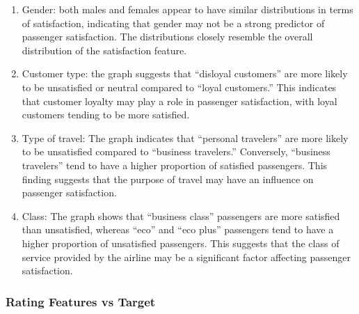 \documentclass[
]{article}
\begin{document}
\begin{enumerate}
\def\labelenumi{\arabic{enumi}.}
\item
  Gender: both males and females appear to have similar distributions in
  terms of satisfaction, indicating that gender may not be a strong
  predictor of passenger satisfaction. The distributions closely
  resemble the overall distribution of the satisfaction feature.
\item
  Customer type: the graph suggests that ``disloyal customers'' are more
  likely to be unsatisfied or neutral compared to ``loyal customers.''
  This indicates that customer loyalty may play a role in passenger
  satisfaction, with loyal customers tending to be more satisfied.
\item
  Type of travel: The graph indicates that ``personal travelers'' are
  more likely to be unsatisfied compared to ``business travelers.''
  Conversely, ``business travelers'' tend to have a higher proportion of
  satisfied passengers. This finding suggests that the purpose of travel
  may have an influence on passenger satisfaction.
\item
  Class: The graph shows that ``business class'' passengers are more
  satisfied than unsatisfied, whereas ``eco'' and ``eco plus''
  passengers tend to have a higher proportion of unsatisfied passengers.
  This suggests that the class of service provided by the airline may be
  a significant factor affecting passenger satisfaction.
\end{enumerate}

\hypertarget{rating-features-vs-target}{%
\subsubsection{Rating Features vs
Target}\label{rating-features-vs-target}}
\end{document}
